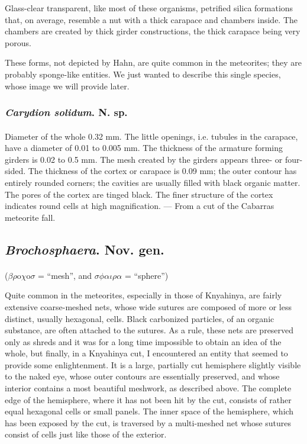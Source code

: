 \documentclass[a4paper, 12pt, oneside]{article}
\begin{document}
Glass-clear transparent, like most of these organisms, petrified silica formations that, on average, resemble a nut with a thick carapace and chambers inside. The chambers are created by thick girder constructions, the thick carapace being very porous.

These forms, not depicted by Hahn, are quite common in the meteorites; they are probably sponge-like entities. We just wanted to describe this single species, whose image we will provide later.
\subsubsection{\emph{Carydion solidum}. N. sp.}
\paragraph{}
Diameter of the whole 0.32 mm. The little openings, i.e. tubules in the carapace, have a diameter of 0.01 to 0.005 mm. The thickness of the armature forming girders is 0.02 to 0.5 mm. The mesh created by the girders appears three- or four-sided. The thickness of the cortex or carapace is 0.09 mm; the outer contour has entirely rounded corners; the cavities are usually filled with black organic matter. The pores of the cortex are tinged black. The finer structure of the cortex indicates round cells at high magnification. --- From a cut of the Cabarras meteorite fall.
\subsection{\emph{Brochosphaera}. Nov. gen.}
\paragraph{}
($\beta\rho$o$\chi$o$\sigma$ = ``mesh'', and $\sigma\phi\alpha\iota\rho\alpha$ = ``sphere'')%

Quite common in the meteorites, especially in those of Knyahinya, are fairly extensive coarse-meshed nets, whose wide sutures are composed of more or less distinct, usually hexagonal, cells. Black carbonized particles, of an organic substance, are often attached to the sutures. As a rule, these nets are preserved only as shreds and it was for a long time impossible to obtain an idea of the whole, but finally, in a Knyahinya cut, I encountered an entity that seemed to provide some enlightenment. It is a large, partially cut hemisphere slightly visible to the naked eye, whose outer contours are essentially preserved, and whose interior contains a most beautiful meshwork, as described above. The complete edge of the hemisphere, where it has not been hit by the cut, consists of rather equal hexagonal cells or small panels. The inner space of the hemisphere, which has been exposed by the cut, is traversed by a multi-meshed net whose sutures consist of cells just like those of the exterior.
\end{document}
